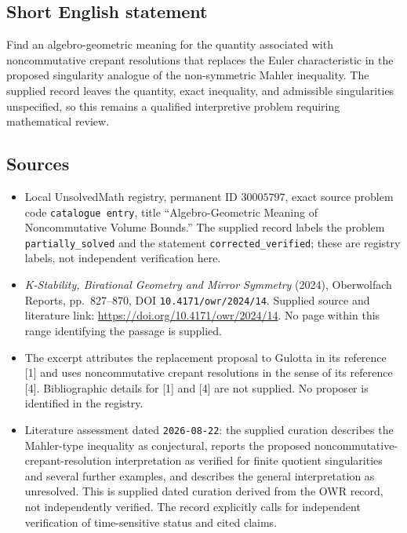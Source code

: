\documentclass[11pt]{article}
\begin{document}
\subsection{Short English statement}
Find an algebro-geometric meaning for the quantity associated with noncommutative crepant resolutions that replaces the Euler characteristic in the proposed singularity analogue of the non-symmetric Mahler inequality. The supplied record leaves the quantity, exact inequality, and admissible singularities unspecified, so this remains a qualified interpretive problem requiring mathematical review.
\subsection{Sources}
\begin{itemize}
\item Local UnsolvedMath registry, permanent ID \(30005797\), exact source problem code \texttt{catalogue entry}, title ``Algebro-Geometric Meaning of Noncommutative Volume Bounds.'' The supplied record labels the problem \texttt{partially\_solved} and the statement \texttt{corrected\_verified}; these are registry labels, not independent verification here.
\item \emph{K-Stability, Birational Geometry and Mirror Symmetry} (2024), Oberwolfach Reports, pp.\ 827--870, DOI \texttt{10.4171/owr/2024/14}. Supplied source and literature link: \url{https://doi.org/10.4171/owr/2024/14}. No page within this range identifying the passage is supplied.
\item The excerpt attributes the replacement proposal to Gulotta in its reference [1] and uses noncommutative crepant resolutions in the sense of its reference [4]. Bibliographic details for [1] and [4] are not supplied. No proposer is identified in the registry.
\item Literature assessment dated \texttt{2026-08-22}: the supplied curation describes the Mahler-type inequality as conjectural, reports the proposed noncommutative-crepant-resolution interpretation as verified for finite quotient singularities and several further examples, and describes the general interpretation as unresolved. This is supplied dated curation derived from the OWR record, not independently verified. The record explicitly calls for independent verification of time-sensitive status and cited claims.
\end{itemize}
\end{document}
